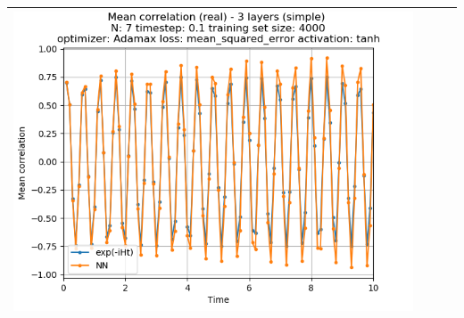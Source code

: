 \documentclass{article}
\begin{document}
\begin{tabular}{|c|c|c|c|}
     \includegraphics[scale=0.37]{./3_layers_simple_train_samples=4000_timestep=0.1_t_total=10.0_optimizer=Adamax_loss=mean_squared_error_activation=tanh/Corr_N=7_(real).png} \\ \hline


\end{tabular}
\end{document}
